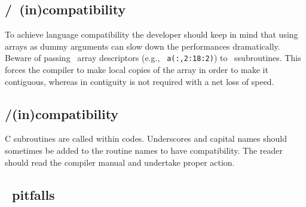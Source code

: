 \subsection{\fort/\oldfort\ (in)compatibility}

To achieve language compatibility the developer should keep in mind that
using arrays as dummy arguments can slow down the performances
dramatically. Beware of passing \fort\ array descriptors (e.g., {\tt
a(:,2:18:2)}) to \oldfort\ ssubroutines. This forces the \fort compiler to
make local copies of the array in order to make it contiguous, whereas in
\fort contiguity is not required with a net loss of speed.

\subsection{\fort/\C (in)compatibility}

C subroutines are called within \fort codes.  Underscores and
capital names should sometimes be added to the routine names to have
compatibility. The reader should read the compiler manual and undertake
proper action.
 

\subsection{\fort\ pitfalls}


